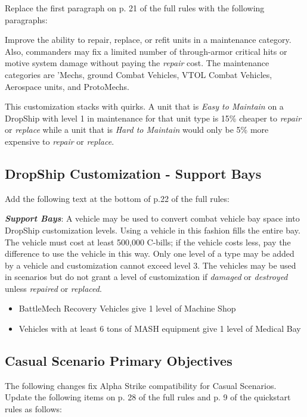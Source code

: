 Replace the first paragraph on p. 21 of the full rules with the following paragraphs:

Improve the ability to repair, replace, or refit units in a maintenance category.
Also, commanders may fix a limited number of through-armor critical hits or motive system damage without paying the \emph{repair} cost.
The maintenance categories are 'Mechs, ground Combat Vehicles, VTOL Combat Vehicles, Aerospace units, and ProtoMechs.

This customization stacks with quirks.
A unit that is \emph{Easy to Maintain} on a DropShip with level 1 in maintenance for that unit type is 15\% cheaper to \emph{repair} or \emph{replace} while a unit that is \emph{Hard to Maintain} would only be 5\% more expensive to \emph{repair} or \emph{replace}.

\subsection{DropShip Customization - Support Bays}

Add the following text at the bottom of p.22 of the full rules:

\emph{\bfseries Support Bays}: A vehicle may be used to convert combat vehicle bay space into DropShip customization levels.
Using a vehicle in this fashion fills the entire bay.
The vehicle must cost at least 500,000 C-bills; if the vehicle costs less, pay the difference to use the vehicle in this way.
Only one level of a type may be added by a vehicle and customization cannot exceed level 3.
The vehicles may be used in scenarios but do not grant a level of customization if \emph{damaged} or \emph{destroyed} unless \emph{repaired} or \emph{replaced}.

\begin{itemize}

\item BattleMech Recovery Vehicles give 1 level of Machine Shop

\item Vehicles with at least 6 tons of MASH equipment give 1 level of Medical Bay

\end{itemize}

\subsection{Casual Scenario Primary Objectives}

The following changes fix Alpha Strike compatibility for Casual Scenarios.
Update the following items on p. 28 of the full rules and p. 9 of the quickstart rules  as follows:

